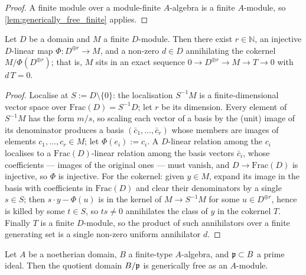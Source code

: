 \begin{proof}
\leanok
  A finite module over a module-finite \(A\)-algebra is a finite
  \(A\)-module, so \cref{lem:generically_free_finite} applies.
\end{proof}

\begin{lemma}\leanok
  \label{lem:generic_rank_comparison}
  Let \(D\) be a domain and \(M\) a finite \(D\)-module.  Then there exist
  \(r \in \mathbb{N}\), an injective \(D\)-linear map
  \(\Phi : D^{\oplus r} \to M\),
  and a non-zero \(d \in D\) annihilating the cokernel
  \(M / \Phi(D^{\oplus r})\); that is, \(M\) sits in an exact sequence
  \(0 \to D^{\oplus r} \to M \to T \to 0\) with \(d\,T = 0\).
\end{lemma}

\begin{proof}
\leanok
  Localise at \(S := D \setminus \{0\}\): the localisation \(S^{-1}M\) is a
  finite-dimensional vector space over \(\mathrm{Frac}(D) = S^{-1}D\); let
  \(r\) be its dimension.  Every element of \(S^{-1}M\) has the form
  \(m/s\), so scaling each vector of a basis by the (unit) image of its
  denominator produces a basis \((\bar c_1, \dots, \bar c_r)\) whose members
  are images of elements \(c_1, \dots, c_r \in M\); let
  \(\Phi(e_i) := c_i\).  A \(D\)-linear relation among the \(c_i\)
  localises to a \(\mathrm{Frac}(D)\)-linear relation among the basis
  vectors \(\bar c_i\), whose coefficients — images of the original ones —
  must vanish, and \(D \to \mathrm{Frac}(D)\) is injective, so \(\Phi\) is
  injective.  For the cokernel: given \(y \in M\), expand its image in the
  basis with coefficients in \(\mathrm{Frac}(D)\) and clear their
  denominators by a single \(s \in S\); then \(s \cdot y - \Phi(u)\) is in
  the kernel of \(M \to S^{-1}M\) for some \(u \in D^{\oplus r}\), hence is
  killed by some \(t \in S\), so \(ts \ne 0\) annihilates the class of
  \(y\) in the cokernel \(T\).  Finally \(T\) is a finite \(D\)-module, so
  the product of such annihilators over a finite generating set is a single
  non-zero uniform annihilator \(d\).
\end{proof}

\begin{lemma}\leanok
  \label{lem:generically_free_domain_core}
  Let \(A\) be a noetherian domain, \(B\) a finite-type \(A\)-algebra, and
  \(\mathfrak{p} \subset B\) a prime ideal.  Then the quotient domain \(B/\mathfrak{p}\) is
  generically free as an \(A\)-module.
\end{lemma}

